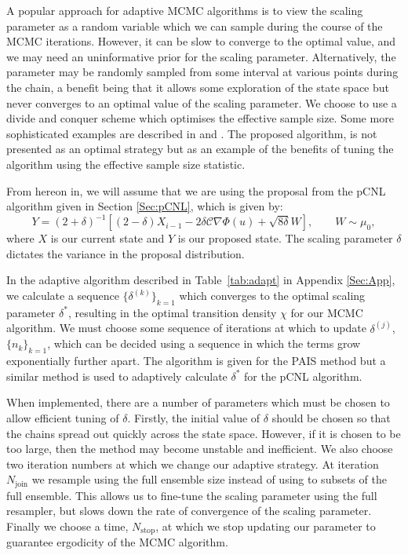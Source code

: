 \documentclass[final]{siamltex}
\begin{document}
A popular approach for adaptive MCMC algorithms is to view the scaling
parameter as a random variable which we can sample during the course
of the MCMC iterations. However, it can be slow to converge to the
optimal value, and we may need an
uninformative prior for the scaling parameter. Alternatively, the parameter may be randomly sampled from some interval at various points during the chain, a benefit being that it allows some exploration of the state space but never converges to an optimal value of the scaling parameter. We choose to use a divide and conquer scheme which optimises the effective sample size. Some more sophisticated examples are described in \cite{roberts2009examples} and \cite{Ji2013adaptive}. The proposed algorithm, is not presented as an optimal strategy but as an example of the benefits of tuning the algorithm using the effective sample size statistic.

From hereon in, we will assume that we are using the proposal from the
pCNL algorithm given in Section \ref{Sec:pCNL}, which is given by:
\begin{equation}Y = (2+\delta)^{-1}\left[(2 - \delta)X_{i-1}-
2\delta\mathcal{C}\nabla \Phi(u)+
\sqrt{8\delta} W\right], \qquad W \sim \mu_0,
\end{equation}
where $X$ is our current state and $Y$ is our proposed state. The
scaling parameter $\delta$ dictates the variance in the proposal distribution.

 In the adaptive algorithm described in Table~\ref{tab:adapt} in
 Appendix \ref{Sec:App}, we calculate a sequence $\{\delta^{(k)}\}_{k=1}$ which converges to the optimal scaling parameter $\delta^*$, resulting in the optimal transition density $\chi$ for our MCMC algorithm. We must choose some sequence of iterations at which to update $\delta^{(j)}$, $\{n_k\}_{k=1}$, which can be decided using a sequence in which the terms grow exponentially further apart. The algorithm is given for the PAIS method but a similar method is used to adaptively calculate $\delta^*$ for the pCNL algorithm.

When implemented, there are a number of parameters which must be
chosen to allow efficient tuning of $\delta$. Firstly, the initial
value of $\delta$ should be chosen so that the chains spread out
quickly across the state space. However, if it is chosen to be too
large, then the method may become unstable and inefficient. We also choose two iteration numbers at which we change our adaptive strategy. At iteration $N_\text{join}$ we resample using the full ensemble size instead of using to subsets of the full ensemble. This allows us to fine-tune the scaling parameter using the full resampler, but slows down the rate of convergence of the scaling parameter. Finally we choose a time, $N_\text{stop}$, at which we stop updating our parameter to guarantee ergodicity of the MCMC algorithm.
\end{document}
